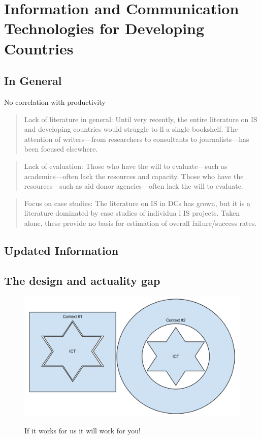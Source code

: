 \chapter{Information and Communication Technologies for Developing Countries}
\section{In General}
No correlation with productivity \cite{rh:isdc}

\begin{quotation}
Lack of literature in general: Until very recently,
the entire literature on IS and developing countries
would struggle to ll a single bookshelf. The
attention of writers—from researchers to consultants
to journalists—has been focused elsewhere.\cite{rh:isdc}
\end{quotation}
\begin{quotation}
Lack of evaluation: Those who have the will to
evaluate—such as academics—often lack the
resources and capacity. Those who have the
resources—such as aid donor agencies—often
lack the will to evaluate.\cite{rh:isdc}
\end{quotation}
\begin{quotation}
Focus on case studies: The literature on IS in
DCs has grown, but it is a literature dominated by
case studies of individua l IS projects. Taken alone,
these provide no basis for estimation of overall
failure/success rates.\cite{rh:isdc}
\end{quotation}


\section{Updated Information}

\section{The design and actuality gap}

\begin{figure}
\centering
\includegraphics[width=\columnwidth]{literature/ict_in_dev/images/contextIctProblem.png}
\label{cip}
\caption{If it works for us it will work for you!}
\end{figure}

